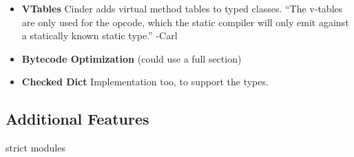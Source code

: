 \documentclass[a4paper,english,cleveref,autoref,thm-restate,anonymous,]{lipics-v2021}
\begin{document}
\begin{itemize}
  \item
    \textbf{VTables}
    Cinder adds virtual method tables to typed classes.
    ``The v-tables are only used for the  opcode, which
    the static compiler will only emit against a statically known static type.'' -Carl


  \item
    \textbf{Bytecode Optimization}
    (could use a full section)


  \item
    \textbf{Checked Dict}
    Implementation too, to support the types.

\end{itemize}


\subsection{Additional Features}


strict modules
\end{document}
